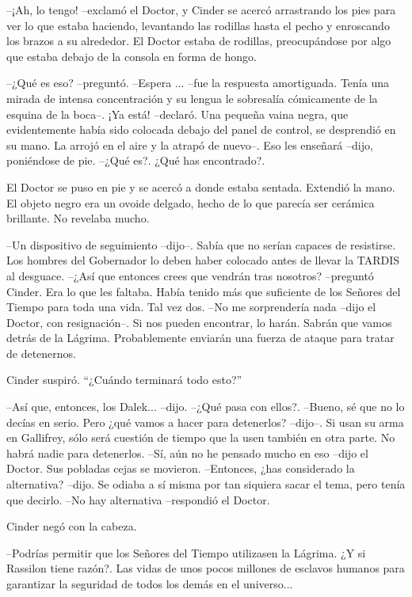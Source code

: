 --¡Ah, lo tengo! --exclamó el Doctor, y Cinder se acercó arrastrando los pies para ver lo que estaba haciendo, levantando las rodillas hasta el pecho y enroscando los brazos a su alrededor.
El Doctor estaba de rodillas, preocupándose por algo que estaba debajo de la consola en forma de hongo. 

--¿Qué es eso? --preguntó.
--Espera ... --fue la respuesta amortiguada. Tenía una mirada de intensa concentración y su lengua le sobresalía cómicamente de la esquina de la boca--. ¡Ya está! --declaró. Una pequeña vaina negra, que evidentemente había sido colocada debajo del panel de control, se desprendió en su mano. La arrojó en el aire y la atrapó de nuevo--. Eso les enseñará --dijo, poniéndose de pie.
--¿Qué es?. ¿Qué has encontrado?.

El Doctor se puso en pie y se acercó a donde estaba sentada. Extendió la mano. El objeto negro era un ovoide delgado, hecho de lo que parecía ser cerámica brillante. No revelaba mucho. 

--Un dispositivo de seguimiento --dijo--. Sabía que no serían capaces de resistirse. Los hombres del Gobernador lo deben haber colocado antes de llevar la TARDIS al desguace.
--¿Así que entonces crees que vendrán tras nosotros? --preguntó Cinder. Era lo que les faltaba. Había tenido más que suficiente de los Señores del Tiempo para toda una vida. Tal vez dos.
--No me sorprendería nada --dijo el Doctor, con resignación--. Si nos pueden encontrar, lo harán. Sabrán que vamos detrás de la Lágrima. Probablemente enviarán una fuerza de ataque para tratar de detenernos.

Cinder suspiró. ``¿Cuándo terminará todo esto?'' 

--Así que, entonces, los Dalek... --dijo.
--¿Qué pasa con ellos?.
--Bueno, sé que no lo decías en serio. Pero ¿qué vamos a hacer para detenerlos? --dijo--. Si usan su arma en Gallifrey, sólo será cuestión de tiempo que la usen también en otra parte. No habrá nadie para detenerlos.
--Sí, aún no he pensado mucho en eso --dijo el Doctor. Sus pobladas cejas se movieron.
--Entonces, ¿has considerado la alternativa? --dijo. Se odiaba a sí misma por tan siquiera sacar el tema, pero tenía que decirlo.
--No hay alternativa --respondió el Doctor.

Cinder negó con la cabeza. 

--Podrías permitir que los Señores del Tiempo utilizasen la Lágrima. ¿Y si Rassilon tiene razón?. Las vidas de unos pocos millones de esclavos humanos para garantizar la seguridad de todos los demás en el universo...

